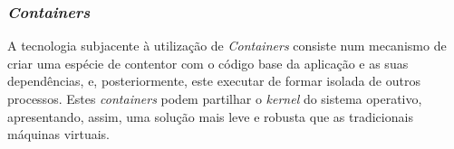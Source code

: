 \subsubsection{\emph{Containers} \label{estado_arte_containers}}
A tecnologia subjacente à utilização de \emph{Containers} consiste num mecanismo de criar uma espécie de contentor com o código base da aplicação e as suas dependências, e, posteriormente, este executar de formar isolada de outros processos.
Estes \emph{containers} podem partilhar o \emph{kernel} do sistema operativo, apresentando, assim, uma solução mais leve e robusta que as tradicionais máquinas virtuais\cite{techradar_containers}.






